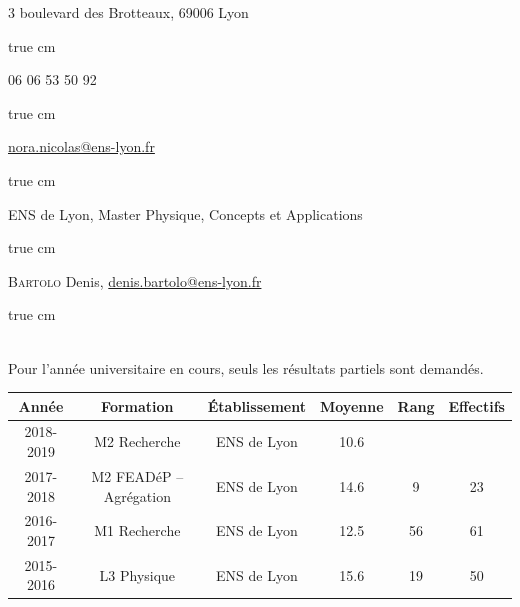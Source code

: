 \documentclass[11pt,a4]{article}
\begin{document}

3 boulevard des Brotteaux, 69006 Lyon

 true cm

06 06 53 50 92

 true cm

\href{mailto:nora.nicolas@ens-lyon.fr}{nora.nicolas@ens-lyon.fr}

 true cm

ENS de Lyon, Master Physique, Concepts et Applications

 true cm

\textsc{Bartolo} Denis, \href{mailto:denis.bartolo@ens-lyon.fr}{denis.bartolo@ens-lyon.fr}

 true cm

 \\ Pour l'année universitaire en cours, seuls les résultats
partiels sont demandés.

\begin{center}
    \begin{tabular}{|c|c|c|c|c|c|} \cline{1-6}
        Année     & Formation               & Établissement & Moyenne & Rang & Effectifs \\ \hline
        2018-2019 & M2 Recherche            & ENS de Lyon   & 10.6    &      & \\ \hline
        2017-2018 & M2 FEADéP -- Agrégation & ENS de Lyon   & 14.6    & 9    & 23 \\ \hline
        2016-2017 & M1 Recherche            & ENS de Lyon   & 12.5    & 56   & 61\\ \hline
        2015-2016 & L3 Physique             & ENS de Lyon   & 15.6    & 19   & 50\\ \hline
    \end{tabular}
\end{center}
\end{document}
